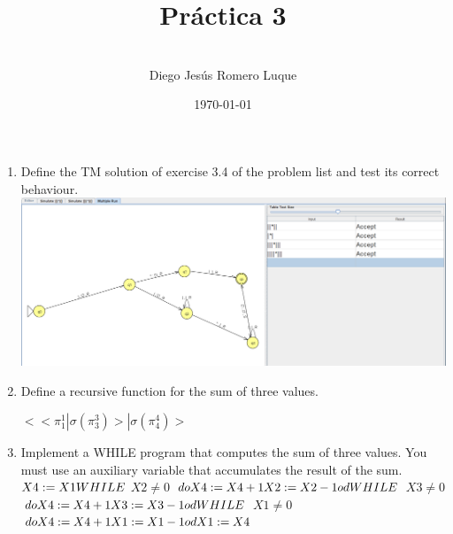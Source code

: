 \documentclass{article}
\title{\textbf{Pr\'actica 3}}
\author{\\Diego Jes\'us Romero Luque}
\date{\today}
\begin{document}
\maketitle
\pagebreak

\begin{enumerate}
  \item Define the TM solution of exercise 3.4 of the problem list and test its correct behaviour.\\
      \includegraphics[scale=0.35]{TM.png}
  \item Define a recursive function for the sum of three values.
    \begin{center}
      $<$$<\pi^1_1|\sigma(\pi^3_3)>|\sigma(\pi^4_4)>$
    \end{center}
        
  \item Implement a WHILE program that computes the sum of three values. You
   must use an auxiliary variable that accumulates the result of the sum.\\
        $X4:=X1\\
        WHILE$ $X2 \not =  0$ $do\\
            X4:=X4+1\\
            X2:=X2-1\\
        od\\
        WHILE$ $X3 \not =  0$ $do\\
        X4:=X4+1\\
        X3:=X3-1\\
        od\\
        WHILE$ $X1 \not =  0$ $do\\
            X4:=X4+1\\
            X1:=X1-1\\
        od\\
        X1:=X4$

\end{enumerate}

\pagebreak
\end{document}
